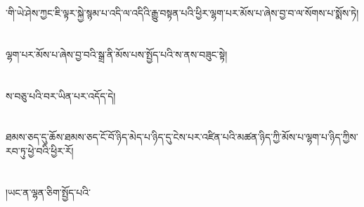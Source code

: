 ་གི་ཡེ་ཤེས་ཀྱང་ཇི་ལྟར་སྐྱེ་སྙམ་པ་འདི་ལ་འདིའི་རྒྱུ་བསྟན་པའི་ཕྱིར་ལྷག་པར་མོས་པ་ཞེས་བྱ་བ་ལ་སོགས་པ་སྨོས་ཏེ།\chapter{ }ལྷག་པར་མོས་པ་ཞེས་བྱ་བའི་སྒྲ་ནི་མོས་པས་སྤྱོད་པའི་ས་ནས་བཟུང་སྟེ།\chapter{ }ས་བཅུ་པའི་བར་ཡིན་པར་འདོད་དེ།\chapter{ }ཐམས་ཅད་དུ་ཆོས་ཐམས་ཅད་ངོ་བོ་ཉིད་མེད་པ་ཉིད་དུ་ངེས་པར་འཛིན་པའི་མཚན་ཉིད་ཀྱི་མོས་པ་ལྷག་པ་ཉིད་ཀྱིས་རབ་ཏུ་ཕྱེ་བའི་ཕྱིར་རོ།\chapter{ }།ཡང་ན་ལྷན་ཅིག་སྤྱོད་པའི་